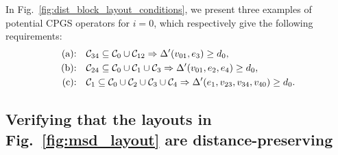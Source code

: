 \documentclass[
 prx,
 reprint,
 superscriptaddress,
 longbibliography,
 dvipsnames
]{revtex4-2}
\begin{document}
In Fig.~\ref{fig:dist_block_layout_conditions}, we present three examples of potential CPGS operators for $i=0$, which respectively give the following requirements:
\begin{align*}
        \text{(a):}\quad& \mathcal{C}_{34} \subseteq \mathcal{C}_{0} \cup \mathcal{C}_{12} \Rightarrow \Delta'\qty(v_{01},e_3) \geq d_0, \\ 
        \text{(b):}\quad&\mathcal{C}_{24} \subseteq \mathcal{C}_{0} \cup \mathcal{C}_{1} \cup \mathcal{C}_{3} \Rightarrow \Delta'\qty(v_{01}, e_2, e_4) \geq d_0, \\ 
        \text{(c):}\quad&\mathcal{C}_{1} \subseteq \mathcal{C}_{0} \cup \mathcal{C}_{2} \cup \mathcal{C}_{3} \cup \mathcal{C}_{4} \Rightarrow \Delta'\qty(e_1,v_{23},v_{34},v_{40}) \geq d_0.
\end{align*}

\begin{widetext}

\subsection{Verifying that the layouts in Fig.~\ref{fig:msd_layout} are distance-preserving}


\end{widetext}
\end{document}
